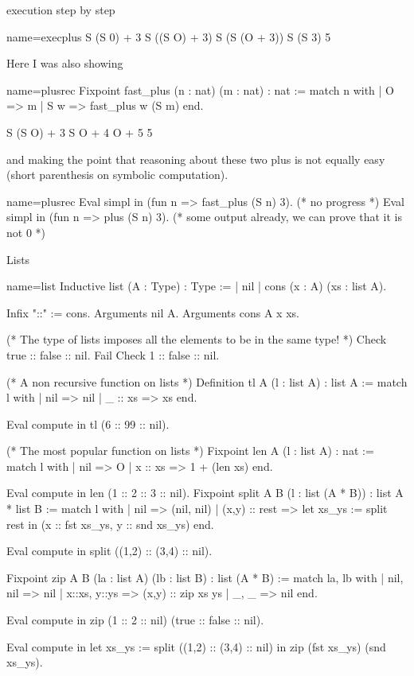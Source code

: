 execution step by step

\begin{coq}{name=execplus}{}
   S (S 0) + 3
   S ((S O) + 3)
   S (S (O + 3))
   S (S 3)
   5
\end{coq}

Here I was also showing

\begin{coq}{name=plusrec}{}
Fixpoint fast_plus (n : nat) (m : nat) : nat :=
  match n with
  | O => m
  | S w => fast_plus w (S m)
  end.

    S (S O) + 3
    S O + 4
    O + 5
    5
\end{coq}

and making the point that reasoning about these two plus is not equally easy (short parenthesis on symbolic computation).

\begin{coq}{name=plusrec}{}
Eval simpl in
  (fun n => fast_plus (S n) 3).  (* no progress *)
Eval simpl in
  (fun n => plus (S n) 3).  (* some output already, we can prove that it is not 0 *)
\end{coq}

Lists

\begin{coq}{name=list}{}
Inductive list (A : Type) : Type :=
| nil
| cons (x : A) (xs : list A).

Infix "::" := cons.
Arguments nil {A}.
Arguments cons {A} x xs.

(* The type of lists imposes all the elements to
    be in the same type! *)
Check true :: false :: nil.
Fail Check 1 :: false :: nil.

(* A non recursive function on lists *)
Definition tl A (l : list A) : list A :=
  match l with
  | nil => nil
  | _ :: xs => xs
  end.

Eval compute in tl (6 :: 99 :: nil).

(* The most popular function on lists *)
Fixpoint len A (l : list A) : nat :=
  match l with
  | nil => O
  | x :: xs => 1 + (len xs)
  end.

Eval compute in len (1 :: 2 :: 3 :: nil).
Fixpoint split A B (l : list (A * B)) : list A * list B :=
  match l with
  | nil => (nil, nil)
  | (x,y) :: rest =>
      let xs_ys := split rest in
      (x :: fst xs_ys, y :: snd xs_ys)
  end.

Eval compute in
  split ((1,2) :: (3,4) :: nil).

Fixpoint zip A B (la : list A) (lb : list B) : list (A * B) :=
  match la, lb with
  | nil, nil => nil
  | x::xs, y::ys => (x,y) :: zip xs ys
  | _, _ => nil
  end.

Eval compute in
  zip (1 :: 2 :: nil) (true :: false :: nil).

Eval compute in
  let xs_ys := split ((1,2) :: (3,4) :: nil) in
  zip (fst xs_ys) (snd xs_ys).
\end{coq}

